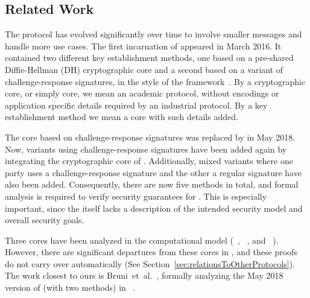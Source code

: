 \documentclass[runningheads, envcountsame, a4paper, draft, x11names]{llncs}
\begin{document}
\subsection{Related Work}
\label{sec:relatedWork}
The \mEdhoc{} protocol has evolved significantly over time to involve smaller
messages and handle more use cases.
%
The first incarnation of \mEdhoc{} appeared in March 2016.
%
It contained two different key establishment methods, one based on a
pre-shared Diffie-Hellman (DH) cryptographic core and a second based on a
variant of challenge-response signatures, in the style of the \mNoise{}
framework~\cite{perrin2016noise}.
%
By a cryptographic core, or simply core, we mean an academic protocol, without
encodings or application specific details required by an industrial protocol.
%
By a key establishment method we mean a core with such details added.
%

The core based on challenge-response signatures was replaced by \mSigma{}
in May 2018.
%
Now, variants using challenge-response signatures have been added again by
integrating the cryptographic core of \mOptls{}.
%
Additionally, mixed variants where one party uses a challenge-response
signature and the other a regular signature have also been added.
%
Consequently, there are now five methods in total, and formal analysis is
required to verify security guarantees for \mEdhoc.
%
This is especially important, since the \mSpec{} itself lacks a description
of the intended security model and overall security goals.
%

Three cores have been analyzed in the computational model (\mSigma{}~\cite{DBLP:conf/crypto/CanettiK02},
\mOptls{}~\cite{DBLP:conf/eurosp/KrawczykW16}, and
\mNoise{}~\cite{DBLP:conf/eurosp/KobeissiNB19}).
%
However, there are significant departures from these cores in \mEdhoc, and
these proofs do not carry over automatically
(See Section~\ref{sec:relationsToOtherProtocols}).
%
The work closest to ours is Bruni~et~al.~\cite{DBLP:conf/secsr/BruniJPS18},
formally analyzing the May 2018 version of \mEdhoc{} (with two methods) in
\mProverif~\cite{DBLP:conf/csfw/Blanchet01}.
%
\end{document}
